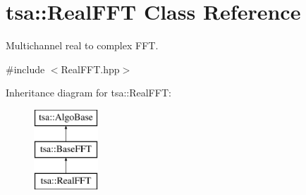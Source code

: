 \hypertarget{classtsa_1_1_real_f_f_t}{}\section{tsa\+:\+:Real\+F\+FT Class Reference}
\label{classtsa_1_1_real_f_f_t}


Multichannel real to complex F\+FT.  




{\ttfamily \#include $<$Real\+F\+F\+T.\+hpp$>$}

Inheritance diagram for tsa\+:\+:Real\+F\+FT\+:\begin{figure}[H]
\begin{center}
\leavevmode
\includegraphics[height=3.000000cm]{classtsa_1_1_real_f_f_t}
\end{center}
\end{figure}
